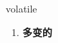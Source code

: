 
\begin{frame}
{\huge volatile}
\begin{center}
\begin{enumerate}\Large
  \item \textbf{多变的}
\end{enumerate}
\end{center}
\end{frame}
